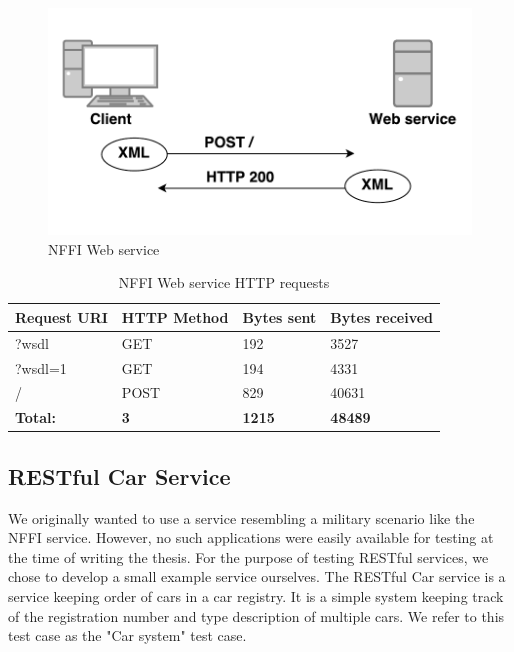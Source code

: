 \begin{figure}[h]
\centering
\includegraphics[scale=0.4]{images/nffi_flow.png}
\caption{NFFI Web service}
\label{figure-nffi-flow}
\end{figure}

\begin{table}[h]
\begin{tabular}{|l|l|l|l|}
\hline
\textbf{Request URI} & \textbf{HTTP Method} & \textbf{Bytes sent} & \textbf{Bytes received} \\ \hline
?wsdl                & GET                  & 192                 & 3527           \\ \hline
?wsdl=1              & GET                  & 194                 & 4331           \\ \hline
/                    & POST                 & 829                 & 40631          \\ \hline
\textbf{Total:}       & \textbf{3}                     & \textbf{1215}                & \textbf{48489}          \\ \hline
\end{tabular}
\caption{NFFI Web service HTTP requests}
\end{table}


\subsection{RESTful Car Service}

We originally wanted to use a service resembling a military scenario like the
NFFI service. However, no such applications were easily available for testing at
the time of writing the thesis. For the purpose of testing RESTful services, we
chose to develop a small example service ourselves. The RESTful Car service is a
service keeping order of cars in a car registry. It is a simple system keeping
track of the registration number and type description of multiple cars. We refer
to this test case as the "Car system" test case.

